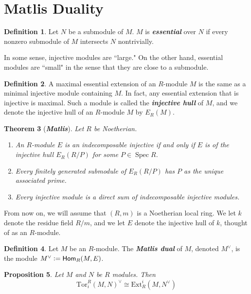 \documentclass[psamsfonts, 12pt]{amsart}
\newtheorem{thm}{Theorem}[section]
\newtheorem{prop}[thm]{Proposition}
\theoremstyle{definition}
\newtheorem{defn}[thm]{Definition}
\theoremstyle{remark}
\renewcommand{\hom}{\mathsf{Hom}}
\newcommand{\ib}[1]{\textbf{\textit{#1}}}
\newcommand{\defeq}{\vcentcolon=}
\DeclareMathOperator{\Spec}{Spec}
\begin{document}
\section{Matlis Duality}
%
\begin{defn}
Let $N$ be a submodule of $M$. $M$ is \ib{essential} over $N$ if every nonzero
submodule of $M$ intersects $N$ nontrivially.
\end{defn}
%
In some sense, injective modules are ``large." On the other hand, essential modules
are ``small" in the sense that they are close to a submodule.
%
\begin{defn}
A maximal essential extension of an $R$-module $M$ is the same as a minimal injective
module containing $M$. In fact, any essential extension that is injective is maximal.
Such a module is called the \ib{injective hull} of $M$, and we denote the injective hull
of an $R$-module $M$ by $E_R(M)$.
\end{defn}
%
\begin{thm}[\ib{Matlis}]
Let $R$ be Noetherian.
\begin{enumerate}
  \item An $R$-module $E$ is an indecomposable injective if and only if
  $E$ is of the injective hull $E_R(R/P)$ for some $P \in \Spec R$.
  \item Every finitely generated submodule of $E_R(R/P)$ has $P$ as the unique
  associated prime.
  \item Every injective module is a direct sum of indecomposable injective modules.
\end{enumerate}
\end{thm}
%
From now on, we will assume that $(R,m)$ is a Noetherian local ring. We let $k$
denote the residue field $R/m$, and we let $E$ denote the injective hull of
$k$, thought of as an $R$-module.
%
\begin{defn}
Let $M$ be an $R$-module. The \ib{Matlis dual} of $M$, denoted $M^\vee$, is the
module $M^\vee \defeq \hom_R(M, E)$.
\end{defn}
%
\begin{prop}
Let $M$ and $N$ be $R$ modules. Then
\[
\mathrm{Tor}^R_i(M,N)^\vee \cong \mathrm{Ext}_R^i(M,N^\vee)
\]
\end{prop}
%
\end{document}
